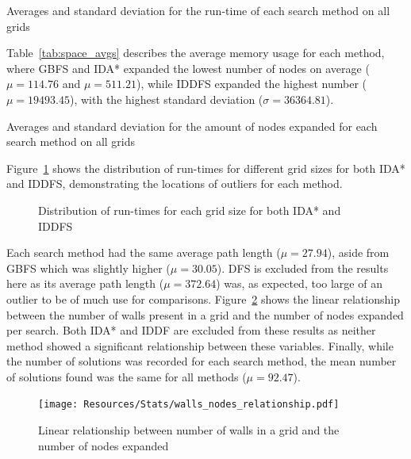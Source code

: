 \begin{table}[H]
	\centering
	
	\caption{Averages and standard deviation for the run-time of each search method on all grids}
	\label{tab:runtime_avgs}
\end{table}

Table~\ref{tab:space_avgs} describes the average memory usage for each method, where GBFS and IDA* expanded the lowest number of nodes on average ($\mu=114.76$ and $\mu=511.21$), while IDDFS expanded the highest number ($\mu=19493.45$), with the highest standard deviation ($\sigma=36364.81$).

\begin{table}[H]
	\centering
	
	\caption{Averages and standard deviation for the amount of nodes expanded for each search method on all grids}
	\label{tab:space_avgs}
\end{table}

Figure~\ref{fig:idas_iddfs_runtime_dist} shows the distribution of run-times for different grid sizes for both IDA* and IDDFS, demonstrating the locations of outliers for each method.

\begin{figure}[H]
	\hfill
	\hfill
	\caption{Distribution of run-times for each grid size for both IDA* and IDDFS}
	\label{fig:idas_iddfs_runtime_dist}
\end{figure}

Each search method had the same average path length ($\mu=27.94$), aside from GBFS which was slightly higher ($\mu=30.05$). DFS is excluded from the results here as its average path length ($\mu=372.64$) was, as expected, too large of an outlier to be of much use for comparisons. Figure~\ref{fig:expanded_walls_relationship} shows the linear relationship between the number of walls present in a grid and the number of nodes expanded per search. Both IDA* and IDDF are excluded from these results as neither method showed a significant relationship between these variables. Finally, while the number of solutions was recorded for each search method, the mean number of solutions found was the same for all methods ($\mu=92.47$).

\begin{figure}[H]
	\centering
	\texttt{[image: Resources/Stats/walls\_nodes\_relationship.pdf]}
	\caption{Linear relationship between number of walls in a grid and the number of nodes expanded}
	\label{fig:expanded_walls_relationship}
\end{figure}

